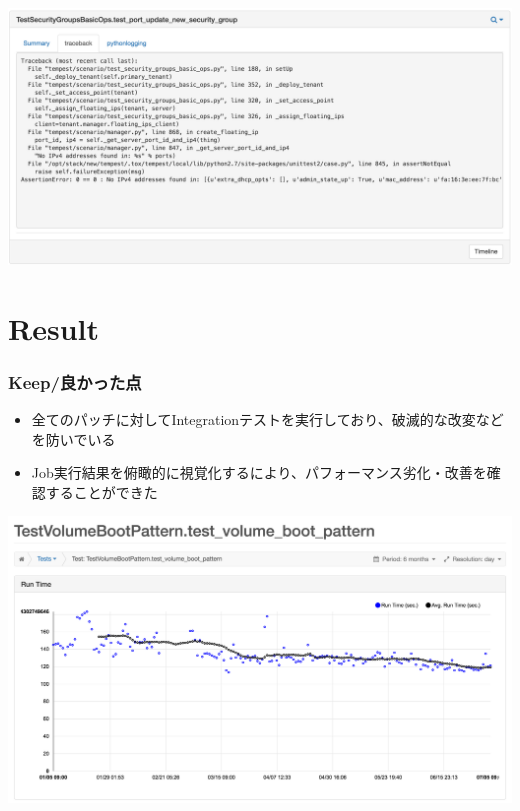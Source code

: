 \documentclass[aspectratio=169,11pt,hyperref={colorlinks=true}]{beamer}
\begin{document}
\begin{frame}
  \begin{center}
    \includegraphics[width=1.3\textheight]{stackviz-sample-traceback.png}
  \end{center}
\end{frame}

\section{Result}
\begin{frame}
  \frametitle{Keep/良かった点}
  \begin{itemize}
    \item 全てのパッチに対してIntegrationテストを実行しており、破滅的な改変などを防いでいる
    \item Job実行結果を俯瞰的に視覚化するにより、パフォーマンス劣化・改善を確認することができた
  \end{itemize}
  \begin{center}
    \includegraphics[width=1.1\textheight]{openstack-health-test_volume_boot_pattern.png}
  \end{center}
\end{frame}
\end{document}
